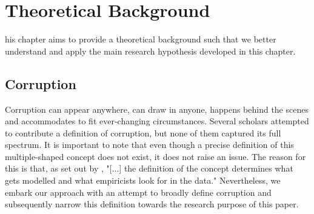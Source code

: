 %
%
\let\textcircled=\pgftextcircled
\chapter{Theoretical Background}
\label{chap:intro}

his chapter aims to provide a theoretical background such that we better understand and apply the main research hypothesis developed in this chapter.
\section{Corruption}
Corruption can appear anywhere, can draw in anyone, happens behind the scenes and accommodates to fit ever-changing circumstances. \citep{transparency} Several scholars attempted to contribute a definition of corruption, but none of them captured its full spectrum. \citep[p. 7]{tanzi1994} It is important to note that even though a precise definition of this multiple-shaped concept does not exist, it does not raise an issue. The reason for this is that, as set out by \citet[p. F632]{aidt2003}, "[...] the definition of the concept determines what gets modelled and what empiricists look for in the data." Nevertheless, we embark our approach with an attempt to broadly define corruption and subsequently narrow this definition towards the research purpose of this paper.

